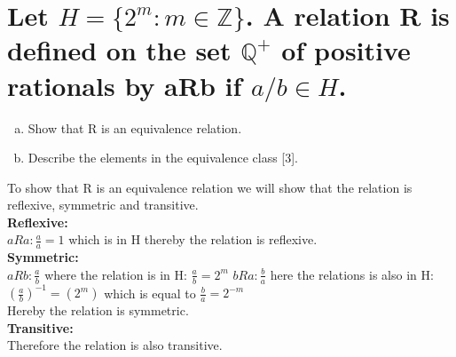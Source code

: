 \newpage
\section{Let $H = \{2^m : m\in \mathbb{Z}\}$. A relation R is defined on the set $\mathbb{Q}^{+}$ of positive rationals by aRb if $a/b\in H$.}
\begin{enumerate}[a.]
\item Show that R is an equivalence relation.
\item Describe the elements in the equivalence class [3].
\end{enumerate}
To show that R is an equivalence relation we will show that the relation is reflexive, symmetric and transitive.\\

\textbf{Reflexive:}\\
$aRa: \frac{a}{a}=1$ which is in H thereby the relation is reflexive.\\
\textbf{Symmetric:}\\
$aRb: \frac{a}{b}$ where the relation is in H: $\frac{a}{b}=2^m$
$bRa: \frac{b}{a}$ here the relations is also in H: $\left(\frac{a}{b}\right)^{-1}=\left(2^m\right)$ which is equal to $\frac{b}{a}=2^{-m}$\\
Hereby the relation is symmetric.\\
\textbf{Transitive:}\\

Therefore the relation is also transitive.\\

\newpage
